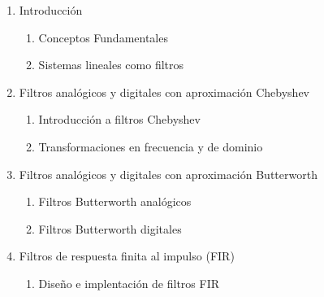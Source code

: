 \begin{enumerate}
  \item{ Introducción
          \begin{enumerate}
            \item{ Conceptos Fundamentales\week
                    
              }
            \item{ Sistemas lineales como filtros\weekrep
                    
              }
          \end{enumerate} 
          
       }
  \item{ Filtros analógicos y digitales con aproximación Chebyshev
          \begin{enumerate}
            \item{ Introducción a filtros Chebyshev\weeks
                    
              }
            \item{ Transformaciones en frecuencia y de dominio\weekss
                    
              }
          \end{enumerate} 
          
       }
       
  \item{ Filtros analógicos y digitales con aproximación Butterworth
          \begin{enumerate}
            \item{ Filtros Butterworth analógicos\weeks
                    
              }
            \item{ Filtros Butterworth digitales\week
                    
              }
          \end{enumerate} 
          
       }
 
  \item{ Filtros de respuesta finita al impulso (FIR)\weeks
          \begin{enumerate}
            \item{ Diseño e implentación de filtros FIR
                    
              }

          \end{enumerate}        
       }
 
\end{enumerate}
